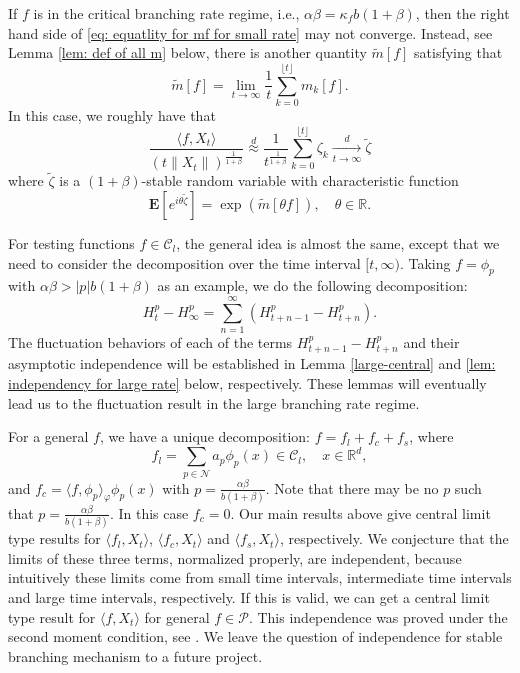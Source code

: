 \documentclass[12pt,a4paper]{amsart}
\theoremstyle{plain}
\theoremstyle{definition}
\numberwithin{equation}{section}
\begin{document}
    If $f$ is in the critical branching rate regime, i.e., $\alpha \beta = \kappa_f b(1+\beta)$,
    then the right hand side of \eqref{eq: equatlity for mf for small rate} may not converge.
    Instead, see Lemma \ref{lem: def of all m} below, there is another quantity $\widetilde m[f]$ satisfying that
\[
    \widetilde{m}[f] = \lim_{t\rightarrow \infty}\frac{1}{t}\sum_{k=0}^{\lfloor t \rfloor}m_k[f].
\]
    In this case, we roughly have that
\[
 	\frac{\langle f,X_t\rangle}{(t\|X_t\|)^{\frac{1}{1+\beta}}} \overset{d}{\approx} \frac{1}{t^{\frac{1}{1+\beta}}} \sum_{k=0}^{\lfloor t\rfloor} \zeta_k \xrightarrow[t\to \infty]{d} \widetilde \zeta
\]
	where $\widetilde \zeta$ is a $(1+\beta)$-stable random variable with characteristic function
\[
    \mathbf E[e^{i\theta \widetilde \zeta}] = \exp(\widetilde m[\theta f]),\quad \theta \in \mathbb R.
\]

    For  testing functions $f\in \mathcal C_l$, the general idea is almost the same, except that we need to consider the decomposition over the time interval $[t,\infty)$. Taking $f = \phi_p$ with $\alpha \beta > |p|b(1+\beta)$ as an example, we do the following decomposition:
\[
    H^p_t-H^p_\infty=\sum^{\infty}_{n=1}(H^p_{t+n-1}-H^p_{t+n}).
\]
    The fluctuation behaviors of each of the terms $H_{t+n-1}^p - H_{t+n}^p$ and their asymptotic independence will be established in Lemma \ref{large-central} and \ref{lem: independency for large rate} below, respectively.
    These lemmas will eventually lead us to the fluctuation result in the large branching rate regime.


    For a general $f$, we have a unique decomposition: $f=f_l+f_c+f_s$, where $$f_l=\sum_{p\in \mathcal{N}}a_p\phi_p(x)\in \mathcal{C}_l,\quad x\in \mathbb{R}^d,$$
 and $f_c=\langle f, \phi_p\rangle_{\varphi} \phi_p(x)$  with $p=\frac{\alpha\beta}{b(1+\beta)}$. Note that there may be no $p$ such that $p=\frac{\alpha\beta}{b(1+\beta)}$. In this case $f_c=0$.
Our main results above give central limit type results for $\langle f_l, X_t\rangle$, $\langle f_c, X_t\rangle$ and $\langle f_s, X_t\rangle$, respectively.
 We conjecture that the limits of these three terms, normalized properly, are independent, because intuitively these limits come from small time intervals, intermediate time intervals and large time intervals, respectively.
 If this is valid, we can get a central limit type result for $\langle f, X_t\rangle$ for general $f\in\mathcal{P}$.
 This independence was proved under the second moment condition, see \cite{RenSongZhang2015Central}.
 We leave the question of independence for stable branching mechanism to a future project.
\end{document}
